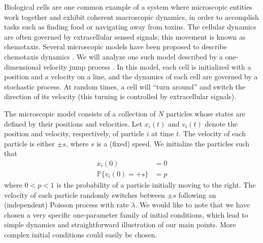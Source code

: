 \documentclass[preprint]{elsarticle}
\begin{document}

Biological cells are one common example of a system where microscopic entities work together and exhibit coherent macroscopic dynamics, in order to accomplish tasks such as finding food or navigating away from toxins.
%
The cellular dynamics are often governed by extracellular sensed signals; this movement is known as chemotaxis. 
%
Several microscopic models have been proposed to describe chemotaxis dynamics \cite{othmer1988models, codling2008random}.
%
We will analyze one such model described by a one-dimensional velocity jump process \cite{othmer2000diffusion}.
%
In this model, each cell is initialized with a position and a velocity on a line, and the dynamics of each cell are governed by a stochastic process.
%
At random times, a cell will ``turn around'' and switch the direction of its velocity (this turning is controlled by extracellular signals). 
%


The microscopic model consists of a collection of $N$ particles whose states are defined by their positions and velocities. 
%
Let $x_i(t)$ and $v_i(t)$ denote the position and velocity, respectively, of particle $i$ at time $t$.
%
The velocity of each particle is either $\pm s$, where $s$ is a (fixed) speed. 
%
We initialize the particles such that
\begin{equation}\label{eqn:system}
\begin{aligned}
x_i(0) & = 0 \\
\mathbb{P} \{ v_i(0) = +s \} & = p
\end{aligned}
\end{equation}
where $0 < p < 1$ is the probability of a particle initially moving to the right.
%
The velocity of each particle randomly switches between $\pm s$ following an (independent) Poisson process with rate $\lambda$.
%
We would like to note that we have chosen a very specific one-parameter family of initial conditions, which lead to simple dynamics and straightforward illustration of our main points.
%
More complex initial conditions could easily be chosen. 
\end{document}
